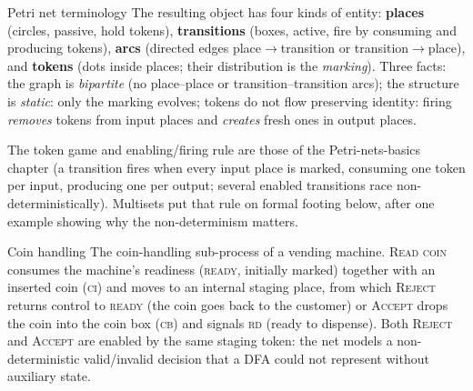 \begin{definitionbox}{Petri net terminology}
The resulting object has four kinds of entity: \textbf{places} (circles, passive, hold tokens), \textbf{transitions} (boxes, active, fire by consuming and producing tokens), \textbf{arcs} (directed edges place$\to$transition or transition$\to$place), and \textbf{tokens} (dots inside places; their distribution is the \emph{marking}). Three facts: the graph is \emph{bipartite} (no place--place or transition--transition arcs); the structure is \emph{static}: only the marking evolves; tokens do not flow preserving identity: firing \emph{removes} tokens from input places and \emph{creates} fresh ones in output places.
\end{definitionbox}

The token game and enabling/firing rule are those of the Petri-nets-basics chapter (a transition fires when every input place is marked, consuming one token per input, producing one per output; several enabled transitions race non-deterministically). Multisets put that rule on formal footing below, after one example showing why the non-determinism matters.

\begin{examplebox}{Coin handling}
The coin-handling sub-process of a vending machine. \textsc{Read coin} consumes the machine's readiness (\textsc{ready}, initially marked) together with an inserted coin (\textsc{ci}) and moves to an internal staging place, from which \textsc{Reject} returns control to \textsc{ready} (the coin goes back to the customer) or \textsc{Accept} drops the coin into the coin box (\textsc{cb}) and signals \textsc{rd} (ready to dispense). Both \textsc{Reject} and \textsc{Accept} are enabled by the same staging token: the net models a non-deterministic valid/invalid decision that a DFA could not represent without auxiliary state.
\begin{center}
\end{center}
\end{examplebox}

